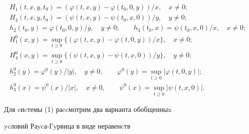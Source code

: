 \begin{gather*}


H_1(t,x,y,t_0)=(\varphi (t,x,y)-\varphi (t_0,0,y))/x,\quad x\ne 0; \\


%


H_4(t,x,y,t_0)=(\psi (t,x,y)-\psi (t_0,x,0))/y, \quad y\ne 0;\\


%


h_2(t_0,y)=\varphi (t_0,0,y)/y, \quad y\ne 0;\qquad


h_3(t_0,x)=\psi (t_0,x,0)/x, \quad x\ne 0;\\


%


H^0_1(x,y)=\sup_{t\ge 0}\{(\varphi(t,x,y)-\varphi(t,0,y))/x\}, \quad x\ne 0;\\


%


H^0_4(x,y)=\sup_{t \ge 0} \{(\psi (t,x,y)-\psi


(t,x,0))/y\}, \quad y\ne 0;\\


%


h^0_2(y)=\varphi^0(y)/|y|,\quad y\ne 0,\qquad


\varphi^0(y)=\sup_{t \ge 0}|\varphi(t,0,y)|;\\


%


h^0_3(x)=\psi^0(x)/|x|, \quad x\ne 0,\qquad


\psi^0(x)=\sup_{t \ge 0}|\psi(t,x,0)|.


\end{gather*}





Для cиcтемы (1) раccмотрим два варианта обобщенныx


ycловий Раycа-Гyрвица в виде неравенcтв


